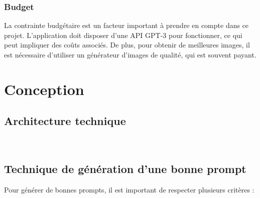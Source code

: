 \documentclass[11,5pt]{report}
\begin{document}
\begin{spacing}{2}
\subsubsection{Budget }La contrainte budgétaire est un facteur important à prendre en compte dans ce projet. L'application doit disposer d'une API GPT-3\cite{OpenAIDocs} pour fonctionner, ce qui peut impliquer des coûts associés. De plus, pour obtenir de meilleures images, il est nécessaire d'utiliser un générateur d'images de qualité, qui est souvent payant.

\section{Conception}
\subsection{Architecture technique}
\vspace{10pt}
\begin{minipage}{\linewidth}
\end{minipage}\\


\subsection{Technique de génération d'une bonne prompt}
Pour générer de bonnes prompts, il est important de respecter plusieurs critères :


\end{spacing}
\end{document}
